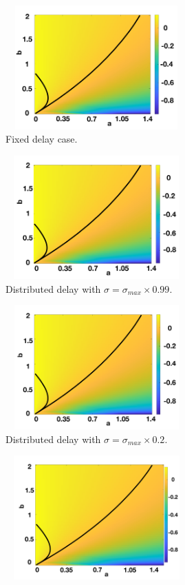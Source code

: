 \begin{figure}[H]
    \centering
    \begin{subfigure}[b]{0.45\textwidth}
        \centering
        \includegraphics[width=7cm,height=4.75cm]{t2f1.png}
        \caption{Fixed delay case.}
        \label{}
    \end{subfigure}
    \hfill
    \begin{subfigure}[b]{0.45\textwidth}
        \centering
        \includegraphics[width=7cm,height=4.75cm]{t2f2.png}
        \caption{Distributed delay with $\sigma=\sigma_{max}\times0.99$.}
        \label{}
    \end{subfigure}
    \hfill
    \begin{subfigure}[b]{0.45\textwidth}
        \centering
        \includegraphics[width=7cm,height=4.75cm]{t2f3.png}
        \caption{Distributed delay with $\sigma=\sigma_{max}\times0.2$.}
        \label{}
    \end{subfigure}
    \hfill
    \begin{subfigure}[b]{0.45\textwidth}
        \centering
        \includegraphics[width=7cm,height=4.75cm]{t2f4.png}

\end{subfigure}
\end{figure}

